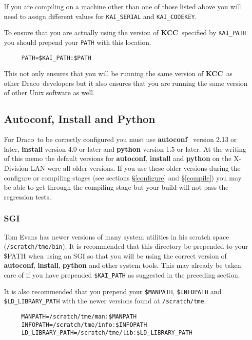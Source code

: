\documentclass[11pt]{nmemo}
\newcommand{\comp}[1]{\normalfont\normalsize\texttt{#1}}
\newcommand{\draco}{{\normalfont\sffamily Draco}}
\newcommand{\kcc}{{\normalfont\bfseries KCC}}
\begin{document}
If you are compiling on a machine other than one of those listed above
you will need to assign different values for \comp{KAI\_SERIAL} and
\comp{KAI\_CODEKEY}. 

To ensure that you are actually using the version of \kcc\ specified by
\comp{KAI\_PATH} you should prepend your \comp{PATH} with this
location.
\begin{verbatim}
     PATH=$KAI_PATH:$PATH
\end{verbatim}
This not only ensures that you will be running the same version of
\kcc\ as other \draco\ developers but it also ensures that you are
running the same version of other Unix software as well.

\subsection{Autoconf, Install and Python}

For \draco\ to be correctly configured you must use
\textbf{autoconf}~\cite{autoconf} version 2.13 or later, \textbf{install}
version 4.0 or later and \textbf{python} version 1.5 or later.  At the
writing of this memo the default versions for \textbf{autoconf},
\textbf{install} and \textbf{python} on the X-Division LAN were all older
versions.  If you use these older versions during the configure or
compiling stages (see sections \S\ref{configure} and \S\ref{compile})
you may be able to get through the compiling stage but your build will
not pass the regression tests.  

\subsubsection{SGI}

Tom Evans has newer versions of many system utilities in his scratch
space (\comp{/scratch/tme/bin}).  It is recommended that this
directory be prepended to your \$PATH when using an SGI so that you
will be using the correct version of \textbf{autoconf},
\textbf{install}, \textbf{python} and other system tools.  This may
already be taken care of if you have prepended \comp{\$KAI\_PATH} as
suggested in the preceding section.

It is also recommended that you prepend your \comp{\$MANPATH},
\comp{\$INFOPATH} and \comp{\$LD\_LIBRARY\_PATH} with the newer
versions found at \comp{/scratch/tme}.

\begin{verbatim}
     MANPATH=/scratch/tme/man:$MANPATH
     INFOPATH=/scratch/tme/info:$INFOPATH
     LD_LIBRARY_PATH=/scratch/tme/lib:$LD_LIBRARY_PATH
\end{verbatim} %
\end{document}
